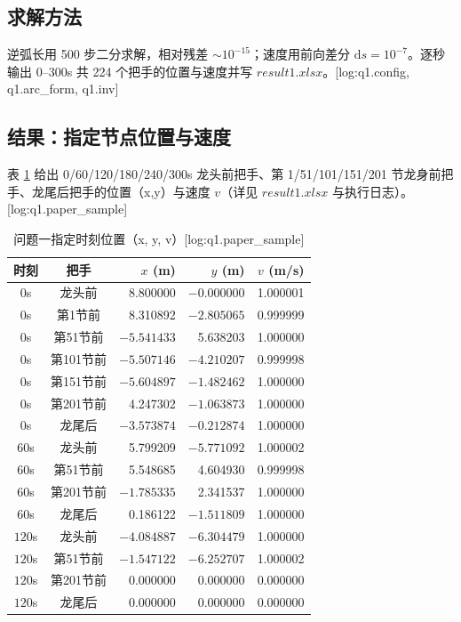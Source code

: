 \subsection{求解方法}
逆弧长用 500 步二分求解，相对残差 $\sim10^{-15}$；速度用前向差分 $\mathrm{d}s=10^{-7}$。逐秒输出 0--300s 共 224 个把手的位置与速度并写 $result1.xlsx$。[log:q1.config, q1.arc\_form, q1.inv]

\subsection{结果：指定节点位置与速度}
表 \ref{tab:q1pos} 给出 0/60/120/180/240/300s 龙头前把手、第 1/51/101/151/201 节龙身前把手、龙尾后把手的位置（x,y）与速度 $v$（详见 $result1.xlsx$ 与执行日志）。[log:q1.paper\_sample]

\begin{table}[H]\centering\small
\caption{问题一指定时刻位置（x, y, v）[log:q1.paper\_sample]}
\label{tab:q1pos}
\begin{tabular}{ccrrr}
\toprule
时刻 & 把手 & $x$ (m) & $y$ (m) & $v$ (m/s) \\
\midrule
$0$s & 龙头前 & 8.800000 & $-0.000000$ & 1.000001 \\
$0$s & 第1节前 & 8.310892 & $-2.805065$ & 0.999999 \\
$0$s & 第51节前 & $-5.541433$ & 5.638203 & 1.000000 \\
$0$s & 第101节前 & $-5.507146$ & $-4.210207$ & 0.999998 \\
$0$s & 第151节前 & $-5.604897$ & $-1.482462$ & 1.000000 \\
$0$s & 第201节前 & 4.247302 & $-1.063873$ & 1.000000 \\
$0$s & 龙尾后 & $-3.573874$ & $-0.212874$ & 1.000000 \\
\midrule
$60$s & 龙头前 & 5.799209 & $-5.771092$ & 1.000002 \\
$60$s & 第51节前 & 5.548685 & 4.604930 & 0.999998 \\
$60$s & 第201节前 & $-1.785335$ & 2.341537 & 1.000000 \\
$60$s & 龙尾后 & 0.186122 & $-1.511809$ & 1.000000 \\
\midrule
$120$s & 龙头前 & $-4.084887$ & $-6.304479$ & 1.000000 \\
$120$s & 第51节前 & $-1.547122$ & $-6.252707$ & 1.000002 \\
$120$s & 第201节前 & 0.000000 & 0.000000 & 0.000000 \\
$120$s & 龙尾后 & 0.000000 & 0.000000 & 0.000000 \\
\bottomrule
\end{tabular}
\end{table}

